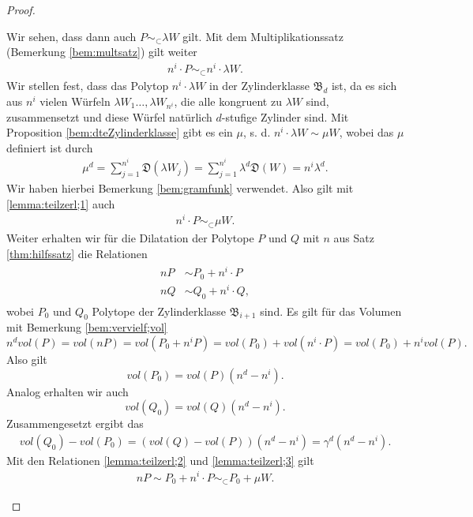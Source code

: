\documentclass[11pt,titlepage]{article}
\theoremstyle{definition}
\theoremstyle{remark}
\begin{document}
\begin{proof}
\begin{itemize}
			Wir sehen, dass dann auch 
			$P\sim_{\subset}\lambda W$ gilt. Mit dem 
			Multiplikationssatz (Bemerkung \ref{bem:multsatz}) gilt weiter
			\begin{align}
				n^i\cdot P\sim_{\subset}n^i \cdot \lambda W.\label{lemma:teilzerl;1}
			\end{align}
			Wir stellen fest, dass das Polytop $n^i\cdot \lambda W$ 
			in der Zylinderklasse $\mathfrak{B}_d$ ist, da es sich 
			aus $n^i$ vielen Würfeln $\lambda W_1\ldots,\lambda W_{n^i}$, 
			die alle kongruent zu $\lambda W$ sind, 
			zusammensetzt und diese Würfel 
			natürlich $d$-stufige Zylinder sind. Mit Proposition 
			\ref{bem:dteZylinderklasse} gibt es ein $\mu$, s. d. 
			$n^i\cdot \lambda W\sim \mu W$, wobei das $\mu$ definiert 
			ist durch
			\begin{align}
				\mu^d =\sum_{j=1}^{n^i}\mathfrak{D}(\lambda W_j)
				=\sum_{j=1}^{n^i}\lambda^d \mathfrak{D}(W)=
				n^i\lambda^d. \label{lemma:teilzerl;5}
			\end{align}
			Wir haben hierbei Bemerkung \ref{bem:gramfunk} 
			verwendet. Also gilt mit \ref{lemma:teilzerl;1} auch
			\begin{align}
				n^i\cdot P\sim_{\subset} \mu W.\label{lemma:teilzerl;2}
			\end{align}
			Weiter erhalten wir für die Dilatation der 
			Polytope $P$ und $Q$ mit $n$ aus Satz \ref{thm:hilfssatz} 
			die Relationen
			\begin{align}
				\begin{split}
					nP&\sim P_0+ n^i\cdot P \\
					nQ&\sim Q_0+ n^i\cdot Q, \label{lemma:teilzerl;3}
				\end{split}
			\end{align}
			wobei $P_0$ und $Q_0$ Polytope der Zylinderklasse 
			$\mathfrak{B}_{i+1}$ sind. Es gilt für das Volumen mit 
			Bemerkung \ref{bem:vervielf;vol} 
			\[n^d vol(P)=vol(nP)=vol(P_0+n^i P)=vol(P_0)+vol(n^i\cdot P)
			=vol(P_0)+n^i vol(P).\]
			Also gilt
			\[vol(P_0)=vol(P)(n^d -n^i).\]
			Analog erhalten wir auch
			\[vol(Q_0)=vol(Q)(n^d -n^i).\]
			Zusammengesetzt ergibt das  
			\begin{align}
				vol(Q_0)-vol(P_0)=(vol(Q)-vol(P))(n^d -n^i)=\gamma^d(n^d-n^i). \label{lemma:teilzerl;4}
			\end{align}
			Mit den Relationen \ref{lemma:teilzerl;2} und 
			\ref{lemma:teilzerl;3} gilt  
			\begin{align}
				nP\sim P_0+n^i\cdot P \sim_{\subset} P_0 + \mu W. \label{lemma:teilzerl;7}
			\end{align}

\end{itemize}
\end{proof}
\end{document}
